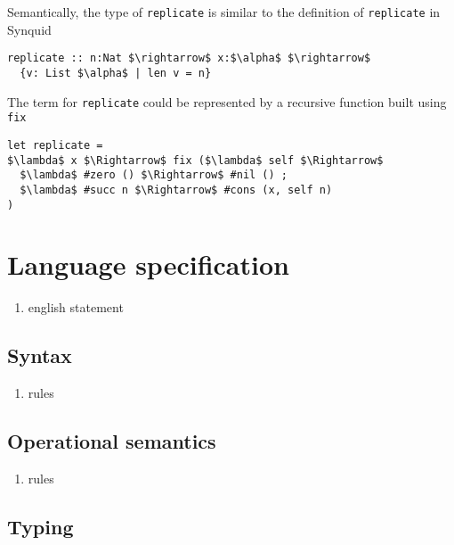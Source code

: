 \documentclass[sigplan,screen]{acmart}
\begin{document}
\hfill

\noindent Semantically, the type of \lstinline{replicate} is similar to the definition of 
\lstinline{replicate} in Synquid \cite{}    

\begin{lstlisting}[keywords={termination, measure, data, where}]
replicate :: n:Nat $\rightarrow$ x:$\alpha$ $\rightarrow$ 
  {v: List $\alpha$ | len v = n}

\end{lstlisting}

\hfill

\noindent The term for \lstinline{replicate} could be represented by a recursive function built using \lstinline{fix} 

\begin{lstlisting}[]
let replicate = 
$\lambda$ x $\Rightarrow$ fix ($\lambda$ self $\Rightarrow$
  $\lambda$ #zero () $\Rightarrow$ #nil () ;
  $\lambda$ #succ n $\Rightarrow$ #cons (x, self n)
) 
\end{lstlisting}


\section{Language specification}
\begin{enumerate}
  \item english statement 
\end{enumerate}
\subsection{Syntax}
\begin{enumerate}
  \item rules 
\end{enumerate}

\subsection{Operational semantics}
\begin{enumerate}
  \item rules 
\end{enumerate}

\subsection{Typing}
\end{document}
